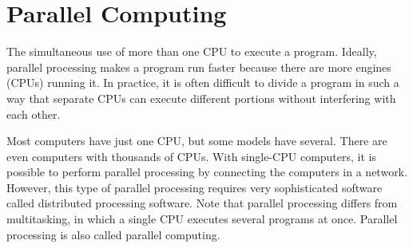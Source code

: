 \section{Parallel Computing}

The simultaneous use of more than one CPU to execute a program. Ideally, parallel processing makes a program run faster because there are more engines (CPUs) running it. In practice, it is often difficult to divide a program in such a way that separate CPUs can execute different portions without interfering with each other. 

Most computers have just one CPU, but some models have several. There are even computers with thousands of CPUs. With single-CPU computers, it is possible to perform parallel processing by connecting the computers in a network. However, this type of parallel processing requires very sophisticated software called distributed processing software. 
Note that parallel processing differs from multitasking, in which a single CPU executes several programs at once. 
Parallel processing is also called parallel computing.
